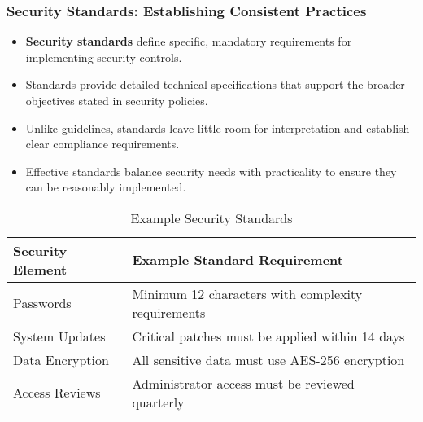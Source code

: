 \documentclass{beamer}
\begin{document}
\begin{frame}
\frametitle{Security Standards: Establishing Consistent Practices}
\begin{itemize}
\item \textbf{Security standards} define specific, mandatory requirements for implementing security controls.
\item Standards provide detailed technical specifications that support the broader objectives stated in security policies.
\item Unlike guidelines, standards leave little room for interpretation and establish clear compliance requirements.
\item Effective standards balance security needs with practicality to ensure they can be reasonably implemented.
\end{itemize}

\begin{table}
\small
\begin{tabular}{|p{3.5cm}|p{7cm}|}
\hline
\textbf{Security Element} & \textbf{Example Standard Requirement} \\
\hline
Passwords & Minimum 12 characters with complexity requirements \\
\hline
System Updates & Critical patches must be applied within 14 days \\
\hline
Data Encryption & All sensitive data must use AES-256 encryption \\
\hline
Access Reviews & Administrator access must be reviewed quarterly \\
\hline
\end{tabular}
\caption{Example Security Standards}
\end{table}
\end{frame}
\end{document}
